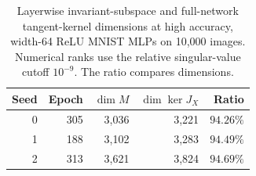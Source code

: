 \begin{table}[!htbp]\centering
\caption{Layerwise invariant-subspace and full-network tangent-kernel dimensions at high accuracy, width-64 ReLU MNIST MLPs on 10,000 images. Numerical ranks use the relative singular-value cutoff $10^{-9}$. The ratio compares dimensions.}
\label{tab:tangent-ocean-seeds}
\small\begin{tabular}{rrrrr}\toprule
Seed & Epoch & $\dim M$ & $\dim\ker J_X$ & Ratio\\\midrule
0 & 305 & 3,036 & 3,221 & $94.26\%$\\
1 & 188 & 3,102 & 3,283 & $94.49\%$\\
2 & 313 & 3,621 & 3,824 & $94.69\%$\\
\bottomrule\end{tabular}
\end{table}
